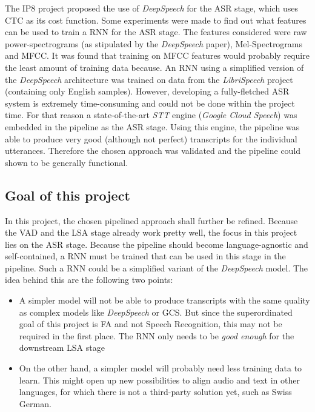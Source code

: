 The IP8 project proposed the use of \textit{DeepSpeech} for the \ac{ASR} stage, which uses \ac{CTC} \parencite{ctc_paper} as its cost function. Some experiments were made to find out what features can be used to train a \ac{RNN} for the \ac{ASR} stage. The features considered were raw power-spectrograms (as stipulated by the \textit{DeepSpeech} paper), Mel-Spectrograms and \ac{MFCC}. It was found that training on \ac{MFCC} features would probably require the least amount of training data because. An \ac{RNN} using a simplified version of the \textit{DeepSpeech} architecture was trained on data from the \textit{LibriSpeech} project (containing only English samples). However, developing a fully-fletched ASR system is extremely time-consuming and could not be done within the project time. For that reason a state-of-the-art \textit{\ac{STT}} engine (\textit{Google Cloud Speech}) was embedded in the pipeline as the \ac{ASR} stage. Using this engine, the pipeline was able to produce very good (although not perfect) transcripts for the individual utterances. Therefore the chosen approach was validated and the pipeline could shown to be generally functional.

\subsection{Goal of this project}

In this project, the chosen pipelined approach shall further be refined. Because the \ac{VAD} and the \ac{LSA} stage already work pretty well, the focus in this project lies on the \ac{ASR} stage. Because the pipeline should become language-agnostic and self-contained, a \ac{RNN} must be trained that can be used in this stage in the pipeline. Such a \ac{RNN} could be a simplified variant of the \textit{DeepSpeech} model. The idea behind this are the following two points:

\begin{itemize}
	\item A simpler model will not be able to produce transcripts with the same quality as complex models like \textit{DeepSpeech} or \ac{GCS}. But since the superordinated goal of this project is \ac{FA} and not Speech Recognition, this may not be required in the first place. The \ac{RNN} only needs to be \textit{good enough} for the downstream \ac{LSA} stage
	\item On the other hand, a simpler model will probably need less training data to learn. This might open up new possibilities to align audio and text in other languages, for which there is not a third-party solution yet, such as Swiss German.
\end{itemize}

